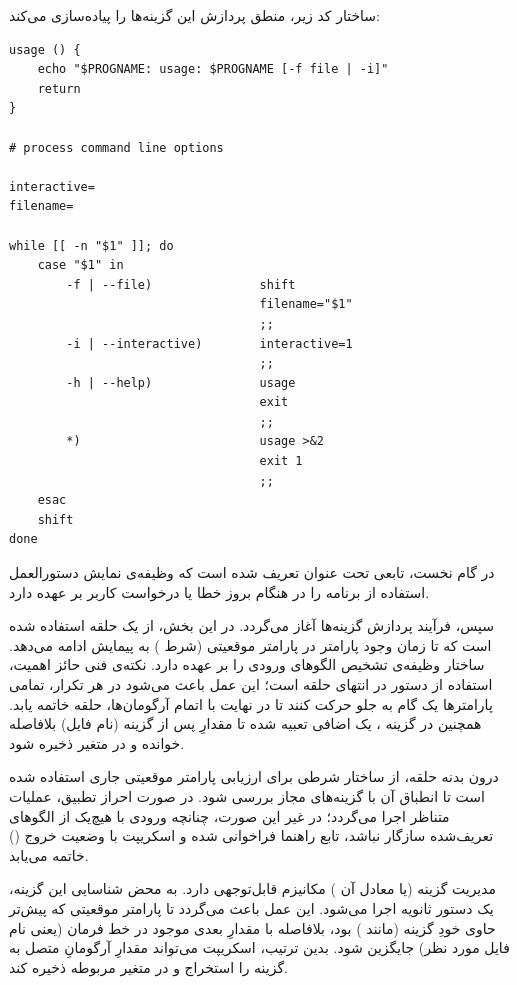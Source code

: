 ساختار کد زیر، منطق پردازش این گزینه‌ها را پیاده‌سازی می‌کند:

\begin{latin}
\begin{lstlisting}
usage () {
    echo "$PROGNAME: usage: $PROGNAME [-f file | -i]"
    return
}

# process command line options

interactive=
filename=

while [[ -n "$1" ]]; do
    case "$1" in
        -f | --file)               shift
                                   filename="$1"
                                   ;;
        -i | --interactive)        interactive=1
                                   ;;
        -h | --help)               usage
                                   exit
                                   ;;
        *)                         usage >&2
                                   exit 1
                                   ;;
    esac
    shift
done
\end{lstlisting}
\end{latin}

در گام نخست، تابعی تحت عنوان  تعریف شده است که وظیفه‌ی نمایش دستورالعمل استفاده از برنامه را در هنگام بروز خطا یا درخواست کاربر بر عهده دارد.

سپس، فرآیند پردازش گزینه‌ها آغاز می‌گردد. در این بخش، از یک حلقه  استفاده شده است که تا زمان وجود پارامتر در پارامتر موقعیتی  (شرط \cmd{[[ -n "\$1" ]]}) به پیمایش ادامه می‌دهد. ساختار  وظیفه‌ی تشخیص الگوهای ورودی را بر عهده دارد. نکته‌ی فنی حائز اهمیت، استفاده از دستور  در انتهای حلقه است؛ این عمل باعث می‌شود در هر تکرار، تمامی پارامترها یک گام به جلو حرکت کنند تا در نهایت با اتمام آرگومان‌ها، حلقه خاتمه یابد. همچنین در گزینه ، یک  اضافی تعبیه شده تا مقدارِ پس از گزینه (نام فایل) بلافاصله خوانده و در متغیر  ذخیره شود.

درون بدنه حلقه، از ساختار شرطی  برای ارزیابی پارامتر موقعیتی جاری استفاده شده است تا انطباق آن با گزینه‌های مجاز بررسی شود. در صورت احراز تطبیق، عملیات متناظر اجرا می‌گردد؛ در غیر این صورت، چنانچه ورودی با هیچ‌یک از الگوهای تعریف‌شده سازگار نباشد، تابع راهنما فراخوانی شده و اسکریپت با وضعیت خروج () خاتمه می‌یابد.

مدیریت گزینه  (یا معادل آن ) مکانیزم قابل‌توجهی دارد. به محض شناسایی این گزینه، یک دستور  ثانویه اجرا می‌شود. این عمل باعث می‌گردد تا پارامتر موقعیتی  که پیش‌تر حاوی خودِ گزینه (مانند ) بود، بلافاصله با مقدارِ بعدی موجود در خط فرمان (یعنی نام فایل مورد نظر) جایگزین شود. بدین ترتیب، اسکریپت می‌تواند مقدارِ آرگومانِ متصل به گزینه را استخراج و در متغیر مربوطه ذخیره کند.

